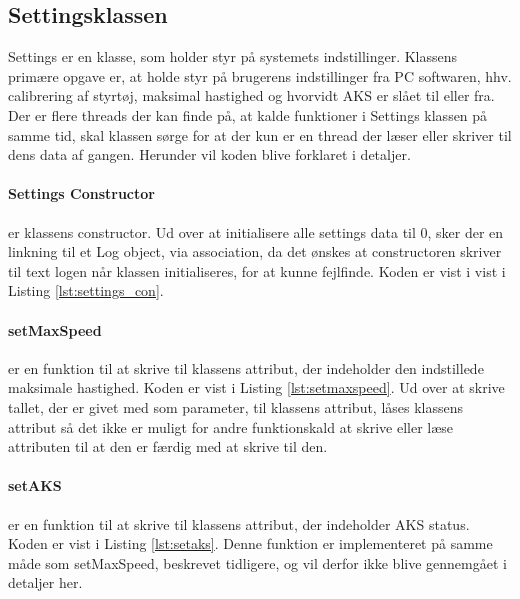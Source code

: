 \subsection{Settingsklassen} \label{sec:settings_impl}

Settings er en klasse, som holder styr på systemets indstillinger. Klassens primære opgave er, at holde styr på brugerens indstillinger fra PC softwaren, hhv. calibrering af styrtøj, maksimal hastighed og hvorvidt AKS er slået til eller fra.
Der er flere threads der kan finde på, at kalde funktioner i Settings klassen på samme tid, skal klassen sørge for at der kun er en thread der læser eller skriver til dens data af gangen.
Herunder vil koden blive forklaret i detaljer.


\paragraph{Settings Constructor} er klassens constructor. Ud over at initialisere alle settings data til 0, sker der en linkning til et Log object, via association, da det ønskes at constructoren skriver til text logen når klassen initialiseres, for at kunne fejlfinde. Koden er vist i vist i Listing \ref{lst:settings_con}.




\paragraph{setMaxSpeed} er en funktion til at skrive til klassens attribut, der indeholder den indstillede maksimale hastighed. Koden er vist i Listing \ref{lst:setmaxspeed}. Ud over at skrive tallet, der er givet med som parameter, til klassens attribut, låses klassens attribut så det ikke er muligt for andre funktionskald at skrive eller læse attributen til at den er færdig med at skrive til den. 




\paragraph{setAKS} er en funktion til at skrive til klassens attribut, der indeholder AKS status. Koden er vist i Listing \ref{lst:setaks}. Denne funktion er implementeret på samme måde som setMaxSpeed, beskrevet tidligere, og vil derfor ikke blive gennemgået i detaljer her.

